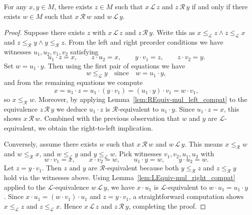 \begin{lemma}
\label{lem:rEquiv_lEquiv_comm}
For any \(x,y \in M\), there exists \(z\in M\) such that \(x \,\mathcal L\, z\) and \(z \,\mathcal R\, y\) if and only if there exists \(w\in M\) such that \(x \,\mathcal R\, w\) and \(w \,\mathcal L\, y\).
\leanok
{}
\end{lemma}
\begin{proof}
\leanok
Suppose there exists \(z\) with \(x \,\mathcal L\, z\) and \(z \,\mathcal R\, y\).  Write this as \(x \le_{\mathcal L} z \land z \le_{\mathcal L} x\) and \(z \le_{\mathcal R} y \land y \le_{\mathcal R} z\).  From the left and right preorder conditions we have witnesses \(u_1,u_2,v_1,v_2\) satisfying
\[
  u_1\cdot z = x,\qquad z\cdot u_2 = x,\qquad y\cdot v_1 = z,\qquad z\cdot v_2 = y.
\]
Set \(w = u_1\cdot y\).  Then using the first pair of equations we have
\[
  w \le_{\mathcal L} y \quad\text{since}\quad w = u_1\cdot y,
\]
and from the remaining equations we compute
\[
  x = u_1\cdot z = u_1\cdot (y\cdot v_1) = (u_1\cdot y)\cdot v_1 = w\cdot v_1,
\]
so \(x \le_{\mathcal R} w\).  Moreover, by applying Lemma~\ref{lem:REquiv-mul_left_compat} to the equivalence \(z \,\mathcal R\, y\) we deduce \(u_1\cdot z\) is \(\mathcal R\)-equivalent to \(u_1\cdot y\).  Since \(u_1\cdot z = x\), this shows \(x \,\mathcal R\, w\).  Combined with the previous observation that \(w\) and \(y\) are \(\mathcal L\)-equivalent, we obtain the right-to-left implication.

Conversely, assume there exists \(w\) such that \(x \,\mathcal R\, w\) and \(w \,\mathcal L\, y\).  This means \(x \le_{\mathcal R} w\) and \(w \le_{\mathcal R} x\), and \(w \le_{\mathcal L} y\) and \(y \le_{\mathcal L} w\).  Pick witnesses \(v_1,v_2,u_1,u_2\) with
\[
  w\cdot v_1 = x,\qquad x\cdot v_2 = w,\qquad u_1\cdot y = w,\qquad y\cdot u_2 = w.
\]
Let \(z = y\cdot v_1\).  Then \(z\) and \(y\) are \(\mathcal R\)-equivalent because both \(y \le_{\mathcal R} z\) and \(z \le_{\mathcal R} y\) hold via the witnesses above.  Using Lemma~\ref{lem:LEquiv-mul_right_compat} applied to the \(\mathcal L\)-equivalence \(w \,\mathcal L\, y\), we have \(x\cdot u_1\) is \(\mathcal L\)-equivalent to \(w\cdot u_1 = u_1\cdot y\).  Since \(x\cdot u_1 = (w\cdot v_1)\cdot u_1\) and \(z = y\cdot v_1\), a straightforward computation shows \(x \le_{\mathcal L} z\) and \(z \le_{\mathcal L} x\).  Hence \(x \,\mathcal L\, z\) and \(z \,\mathcal R\, y\), completing the proof.
\end{proof}
